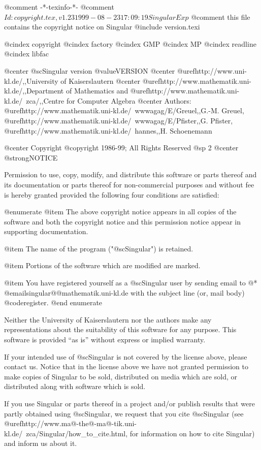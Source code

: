 @comment -*-texinfo-*-
@comment $Id: copyright.tex,v 1.23 1999-08-23 17:09:19 Singular Exp $
@comment this file contains the copyright notice on Singular
@include version.texi

@cindex copyright
@cindex factory
@cindex GMP
@cindex MP
@cindex readline
@cindex libfac

@center @sc{Singular} version @value{VERSION}
@center @uref{http://www.uni-kl.de/,,University of Kaiserslautern}
@center @uref{http://www.mathematik.uni-kl.de/,,Department of Mathematics} and  @uref{http://www.mathematik.uni-kl.de/~zca/,,Centre for Computer Algebra}
@center Authors: @uref{http://www.mathematik.uni-kl.de/~wwwagag/E/Greuel,,G.-M. Greuel}, @uref{http://www.mathematik.uni-kl.de/~wwwagag/E/Pfister,,G. Pfister}, @uref{http://www.mathematik.uni-kl.de/~hannes,,H. Schoenemann}

@center Copyright @copyright{} 1986-99; All Rights Reserved
@sp 2
@center @strong{NOTICE}

Permission to use, copy, modify, and distribute this software or parts
thereof and its documentation or parts thereof for non-commercial
purposes and without fee is hereby granted provided the following four
conditions are satisfied:

@enumerate
@item
The above copyright notice appears in all copies of the software
and both the copyright notice and this permission notice
appear in supporting documentation.

@item
The name of the program ("@sc{Singular}") is retained.

@item
Portions of the software which are modified are marked.

@item
You have registered yourself as a @sc{Singular} user by sending email to @*
@email{singular@@mathematik.uni-kl.de}
with the subject line (or, mail body)
@code{register}.
@end enumerate

Neither the University of Kaiserslautern nor the authors make any
representations about the suitability of this software for any
purpose.  This software is provided ``as is'' without express or
implied warranty.

If your intended use of @sc{Singular} is not covered by the license above,
please contact us.  Notice that in the license above we have not
granted permission to make copies of Singular to be sold, distributed
on media which are sold, or distributed along with software which is
sold.

If you use Singular or parts thereof in a project and/or publish
results that were partly obtained using @sc{Singular}, we request that you
cite @sc{Singular} (see
@uref{http://www.ma@-the@-ma@-tik.uni-kl.de/~zca/Singular/how_to_cite.html, for information}
 on how to cite Singular) and inform us about it.

